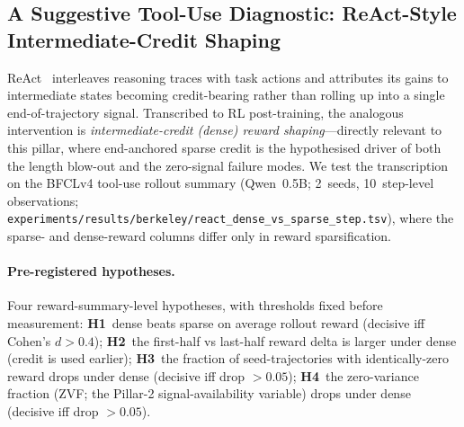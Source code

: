 %
%

\subsection{A Suggestive Tool-Use Diagnostic: ReAct-Style Intermediate-Credit Shaping}
\label{sec:length-bias-react-shaping}

ReAct~\citep{yao2023react} interleaves reasoning traces with
task actions and attributes its gains to intermediate states
becoming credit-bearing rather than rolling up into a single
end-of-trajectory signal. Transcribed to RL post-training, the
analogous intervention is \emph{intermediate-credit (dense)
reward shaping}---directly relevant to this pillar, where
end-anchored sparse credit is the hypothesised driver of both
the length blow-out and the zero-signal failure modes. We test
the transcription on the BFCLv4 tool-use rollout summary
(Qwen~0.5B; 2~seeds, 10~step-level observations;
\texttt{experiments/results/berkeley/react\_dense\_vs\_sparse\_step.tsv}),
where the sparse- and dense-reward columns differ only in reward
sparsification.

\paragraph{Pre-registered hypotheses.}
Four reward-summary-level hypotheses, with thresholds fixed
before measurement: \textbf{H1}~dense beats sparse on average
rollout reward (decisive iff Cohen's $d > 0.4$);
\textbf{H2}~the first-half vs last-half reward delta is larger
under dense (credit is used earlier); \textbf{H3}~the fraction
of seed-trajectories with identically-zero reward drops under
dense (decisive iff drop $> 0.05$); \textbf{H4}~the
zero-variance fraction (ZVF; the Pillar-2 signal-availability
variable) drops under dense (decisive iff drop $> 0.05$).

